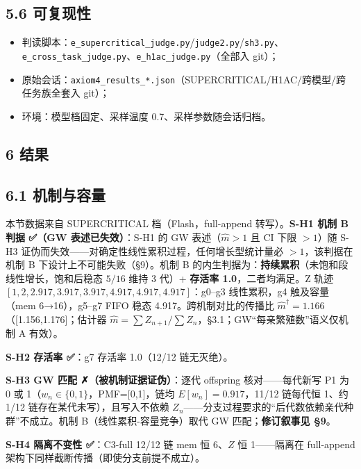 \documentclass[
]{ctexart}
\providecommand{\tightlist}{%
  \setlength{\itemsep}{0pt}\setlength{\parskip}{0pt}}
\begin{document}
\subsection{5.6 可复现性}\label{ux53efux590dux73b0ux6027}

\begin{itemize}
\tightlist
\item
  判读脚本：\texttt{e\_supercritical\_judge.py}/\texttt{judge2.py}/\texttt{sh3.py}、\texttt{e\_cross\_task\_judge.py}、\texttt{e\_h1ac\_judge.py}（全部入
  git）；
\item
  原始会话：\texttt{axiom4\_results\_*.json}（SUPERCRITICAL/H1AC/跨模型/跨任务族全套入
  git）；
\item
  环境：模型档固定、采样温度 0.7、采样参数随会话归档。
\end{itemize}

\subsection{6 结果}\label{ux7ed3ux679c}

\subsection{6.1 机制与容量}\label{ux673aux5236ux4e0eux5bb9ux91cf}

本节数据来自 SUPERCRITICAL 档（Flash，full-append 转写）。\textbf{S-H1
机制 B 判据 ✅（GW 表述已失效）}：S-H1 的 GW 表述（\(\hat m>1\) 且 CI
下限 \(>1\)）随 S-H3
证伪而失效------对确定性线性累积过程，任何增长型统计量必
\(>1\)，该判据在机制 B 下设计上不可能失败（§9）。机制 B
的内生判据为：\textbf{持续累积}（未饱和段线性增长，饱和后稳态 \(5/16\)
维持 3 代）+ \textbf{存活率 1.0}，二者均满足。Z 轨迹
\([1,2,2.917,3.917,3.917,4.917,4.917,4.917]\)：g0--g3 线性累积，g4
触及容量（mem 6→16），g5--g7 FIFO 稳态 4.917。跨机制对比的传播比
\(\hat m^\dagger=1.166\)（{[}1.156,1.176{]}；估计器
\(\hat m=\sum Z_{n+1}/\sum Z_n\)，§3.1；GW``每亲繁殖数''语义仅机制 A
有效）。

\textbf{S-H2 存活率 ✅}：g7 存活率 1.0（12/12 链无灭绝）。

\textbf{S-H3 GW 匹配 ✗（被机制证据证伪）}：逐代 offspring
核对------每代新写 P1 为 0 或 1（\(w_n\in\{0,1\}\)，PMF={[}0,1{]}，链均
\(E[w_n]=0.917\)，11/12 链每代恒 1、约 1/12
链存在某代未写），且写入不依赖
\(Z_n\)------分支过程要求的``后代数依赖亲代种群''不成立。机制
B（线性累积-容量竞争）取代 GW 匹配；\textbf{修订叙事见 §9}。

\textbf{S-H4 隔离不变性 ✅}：C3-full 12/12 链 mem 恒 6、\(Z\) 恒
1------隔离在 full-append 架构下同样截断传播（即使分支前提不成立）。
\end{document}
